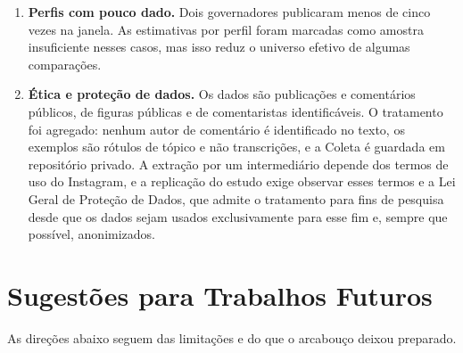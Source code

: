 \begin{enumerate}
    \item \textbf{Perfis com pouco dado.} Dois governadores publicaram menos de cinco vezes na janela. As estimativas por perfil foram marcadas como amostra insuficiente nesses casos, mas isso reduz o universo efetivo de algumas comparações.
    \item \textbf{Ética e proteção de dados.} Os dados são publicações e comentários públicos, de figuras públicas e de comentaristas identificáveis. O tratamento foi agregado: nenhum autor de comentário é identificado no texto, os exemplos são rótulos de tópico e não transcrições, e a Coleta é guardada em repositório privado. A extração por um intermediário depende dos termos de uso do Instagram, e a replicação do estudo exige observar esses termos e a Lei Geral de Proteção de Dados, que admite o tratamento para fins de pesquisa desde que os dados sejam usados exclusivamente para esse fim e, sempre que possível, anonimizados.
\end{enumerate}

\section{Sugestões para Trabalhos Futuros}

As direções abaixo seguem das limitações e do que o arcabouço deixou preparado.

